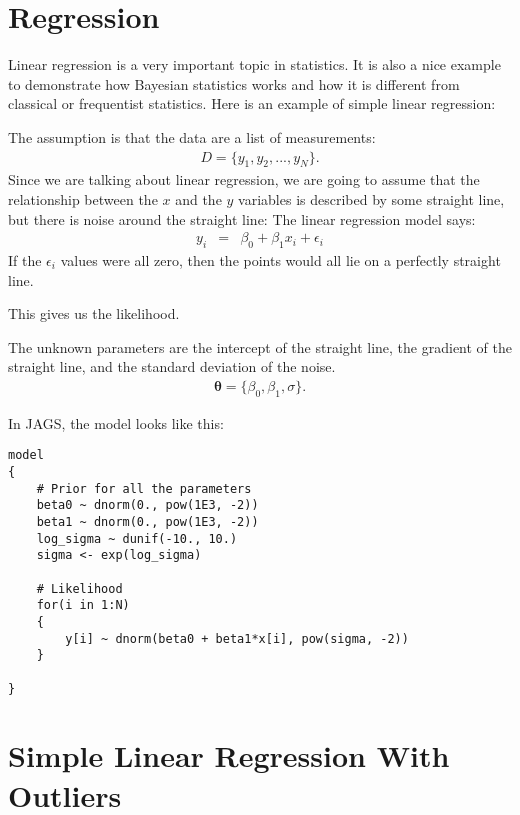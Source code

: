 \chapter{Regression}

Linear regression is a very important topic in statistics. It is also a nice
example to demonstrate how Bayesian statistics works and how it is different
from classical or frequentist statistics. Here is an example of simple linear
regression:



The assumption is that the data are a list of measurements:
\begin{eqnarray}
D = \{y_1, y_2, ..., y_N\}.
\end{eqnarray}
Since we are talking about linear regression, we are going to assume that the
relationship between the $x$ and the $y$ variables is described by some
straight line, but there is noise around the straight line:
The linear regression model says:
\begin{eqnarray}
y_i &=& \beta_0 + \beta_1 x_i + \epsilon_i
\end{eqnarray}
If the $\epsilon_i$ values were all zero, then the points would all lie on
a perfectly straight line.

This gives us the likelihood.

The unknown parameters are the intercept of the straight line, the gradient of
the straight line, and the standard deviation of the noise.
\begin{eqnarray}
\boldsymbol{\theta} = \{\beta_0, \beta_1, \sigma\}.
\end{eqnarray}

In JAGS, the model looks like this:
\begin{verbatim}
model
{
    # Prior for all the parameters
    beta0 ~ dnorm(0., pow(1E3, -2))
    beta1 ~ dnorm(0., pow(1E3, -2))
    log_sigma ~ dunif(-10., 10.)
    sigma <- exp(log_sigma)

    # Likelihood
    for(i in 1:N)
    {
        y[i] ~ dnorm(beta0 + beta1*x[i], pow(sigma, -2))
    }

}
\end{verbatim}




\chapter{Simple Linear Regression With Outliers}

